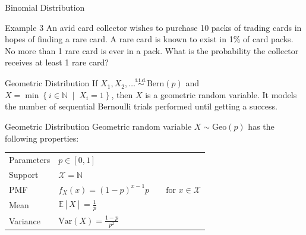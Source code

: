 \documentclass[10pt]{beamer}
\begin{document}
\begin{frame}[fragile]{Binomial Distribution}
\begin{exampleblock}{Example 3}
An avid card collector wishes to purchase 10 packs of trading cards in hopes of finding a rare card. A rare card is known to exist in 1\% of card packs. No more than 1 rare card is ever in a pack. What is the probability the collector receives at least 1 rare card?
\end{exampleblock}
\end{frame}

\begin{frame}[fragile]{Geometric Distribution}
If \(X_1, X_2, \dots \overset{\textrm{i.i.d.}}{\sim} \textrm{Bern}\left(p\right)\) and \(X = \min\left\{i \in \mathbb{N} \;\middle|\; X_i = 1\right\}\), then \(X\) is a geometric random variable. It models the number of sequential Bernoulli trials performed until getting a success.

\begin{alertblock}{Geometric Distribution}
Geometric random variable \(X \sim \textrm{Geo}\left(p\right)\) has the following properties:
  \begin{table}
    \begin{tabular}{ll}
      \toprule
      Parameters & \(p \in \left[0,1\right]\)\\
      Support & \(\mathcal{X} = \mathbb{N}\)\\
      PMF & \(f_X\left(x\right) = \left(1 - p\right)^{x - 1}p\qquad\textrm{for }x \in \mathcal{X}\)\\
      Mean & \(\mathbb{E}\left[X\right] = \frac{1}{p}\)\\
      Variance & \(\textrm{Var}\left(X\right) = \frac{1 - p}{p^2}\)\\
      \bottomrule
    \end{tabular}
  \end{table}
\end{alertblock}
\end{frame}
\end{document}

